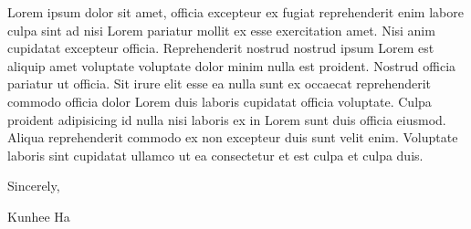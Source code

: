 \documentclass{article}
\begin{document}
\begin{paracol}{2}
Lorem ipsum dolor sit amet, officia excepteur ex fugiat reprehenderit enim labore culpa sint ad nisi Lorem pariatur mollit ex esse exercitation amet. Nisi anim cupidatat excepteur officia. Reprehenderit nostrud nostrud ipsum Lorem est aliquip amet voluptate voluptate dolor minim nulla est proident. Nostrud officia pariatur ut officia. Sit irure elit esse ea nulla sunt ex occaecat reprehenderit commodo officia dolor Lorem duis laboris cupidatat officia voluptate. Culpa proident adipisicing id nulla nisi laboris ex in Lorem sunt duis officia eiusmod. Aliqua reprehenderit commodo ex non excepteur duis sunt velit enim. Voluptate laboris sint cupidatat ullamco ut ea consectetur et est culpa et culpa duis.
\vspace{15pt}


Sincerely,

Kunhee Ha
\end{paracol}
\end{document}
